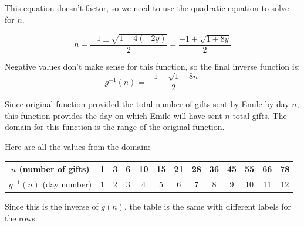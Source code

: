 \documentclass[fleqn,addpoints]{exam}
\begin{document}
\begin{questions}
\begin{solution}
This equation doesn't factor, so we need to use the quadratic equation to solve for $n$.

\[
  n = \frac{-1 \pm \sqrt{1 - 4(-2y)}}{2} = \frac{-1 \pm \sqrt{1 + 8y}}{2}
\]

Negative values don't make sense for this function, so the final inverse function is:
\[
  g^{-1}(n) = \frac{-1 + \sqrt{1 + 8n}}{2}
\]

Since original function provided the total number of gifts sent by Emile by day $n$, this function provides the day on
which Emile will have sent $n$ total gifts.  The domain for this function is the range of the original function.

Here are all the values from the domain:

\begin{tabular}{|c|c|c|c|c|c|c|c|c|c|c|c|c|}
\hline
  $n$ (number of gifts)    & 1 & 3 & 6 & 10 & 15 & 21 & 28 & 36 & 45 & 55 & 66 & 78 \\
\hline
  $g^{-1}(n)$  (day number) & 1 & 2 & 3 & 4 & 5  & 6   & 7 & 8  & 9 & 10 & 11 & 12 \\
\hline
\end{tabular}

Since this is the inverse of $g(n)$, the table is the same with different labels for the rows.
\end{solution}
 
\end{questions}

\ifprintanswers
\else

\makebox[\textwidth]\hrulefill
\end{document}
